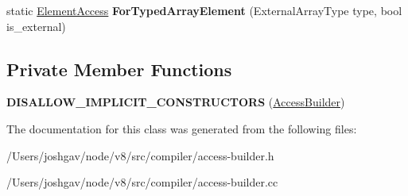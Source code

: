 \begin{DoxyCompactItemize}
\item 
static \hyperlink{structv8_1_1internal_1_1compiler_1_1_element_access}{Element\+Access} {\bfseries For\+Typed\+Array\+Element} (External\+Array\+Type type, bool is\+\_\+external)\hypertarget{classv8_1_1internal_1_1compiler_1_1_access_builder_abd1ea13ee9156b6e746a9fd8f21c53f2}{}\label{classv8_1_1internal_1_1compiler_1_1_access_builder_abd1ea13ee9156b6e746a9fd8f21c53f2}

\end{DoxyCompactItemize}
\subsection*{Private Member Functions}
\begin{DoxyCompactItemize}
\item 
{\bfseries D\+I\+S\+A\+L\+L\+O\+W\+\_\+\+I\+M\+P\+L\+I\+C\+I\+T\+\_\+\+C\+O\+N\+S\+T\+R\+U\+C\+T\+O\+RS} (\hyperlink{classv8_1_1internal_1_1compiler_1_1_access_builder}{Access\+Builder})\hypertarget{classv8_1_1internal_1_1compiler_1_1_access_builder_acf60793e7eaffbc18215caafa3b831a0}{}\label{classv8_1_1internal_1_1compiler_1_1_access_builder_acf60793e7eaffbc18215caafa3b831a0}

\end{DoxyCompactItemize}


The documentation for this class was generated from the following files\+:\begin{DoxyCompactItemize}
\item 
/\+Users/joshgav/node/v8/src/compiler/access-\/builder.\+h\item 
/\+Users/joshgav/node/v8/src/compiler/access-\/builder.\+cc\end{DoxyCompactItemize}
